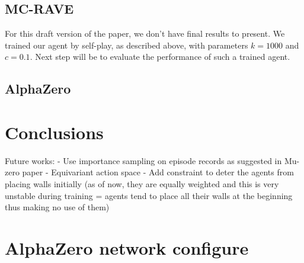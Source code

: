 \documentclass[journal, a4paper]{IEEEtran}
\begin{document}
\subsection{MC-RAVE}
For this draft version of the paper, we don't have final results to present. We trained our agent by self-play, as described above, with parameters $k=1000$ and $c=0.1$. Next step will be to evaluate the performance of such a trained agent.

\subsection{AlphaZero}


\section{Conclusions}
\label{sec:conclusion}

Future works:
- Use importance sampling on episode records as suggested in Mu-zero paper
- Equivariant action space
- Add constraint to deter the agents from placing walls initially (as of now, they are equally weighted and this is very unstable during training = agents tend to place all their walls at the beginning thus making no use of them)




\newpage
\section*{AlphaZero network configure}
\label{sec:alphazero-network}
\end{document}
